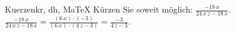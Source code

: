 \begin{MAufgabe}{Kuerzen}{kr, dh, MaTeX}
K\"urzen Sie soweit m\"oglich: $\frac{- 18\, x}{24\, x\, z - 18\, x}$.\\ 
\ifLsg\MLoesung
\quad $\frac{- 18\, x}{24\, x\, z - 18\, x}=\frac{(6\, x)\cdot(-3)}{(6\, x)\cdot(4\, z - 3)}=\frac{-3}{4\, z - 3}$.\else\relax\fi
 \end{MAufgabe}